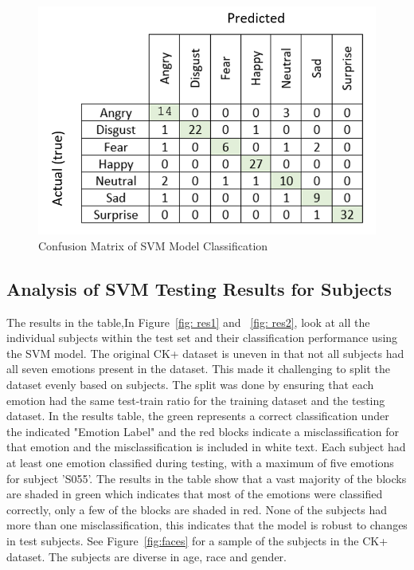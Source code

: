 \begin{figure}[H]
  \centering
  \includegraphics[scale=0.8]{conf1}
  \caption{Confusion Matrix of SVM Model Classification}
  \label{fig:confu}
\end{figure} 


\subsection{Analysis of SVM Testing Results for Subjects}
The results in the table,In Figure~\ref{fig: res1} and ~\ref{fig: res2}, look at all the individual subjects within the test set and their classification performance using the SVM model. The original CK+ dataset is uneven in that not all subjects had all seven emotions present in the dataset. This made it challenging to split the dataset evenly based on subjects. The split was done by ensuring that each emotion had the same test-train ratio for the training dataset and the testing dataset. 
\newline
\newline
In the results table, the green represents a correct classification under the indicated "Emotion Label" and the red blocks indicate a misclassification for that emotion and the misclassification is included in white text. Each subject had at least one emotion classified during testing, with a maximum of five emotions for subject 'S055'. 
The results in the table show that a vast majority of the blocks are shaded in green which indicates that most of the emotions were classified correctly, only a few of the blocks are shaded in red. None of the subjects had more than one misclassification, this indicates that the model is robust to changes in test subjects. See Figure~\ref{fig:faces} for a sample of the subjects in the CK+ dataset. The subjects are diverse in age, race and gender.

